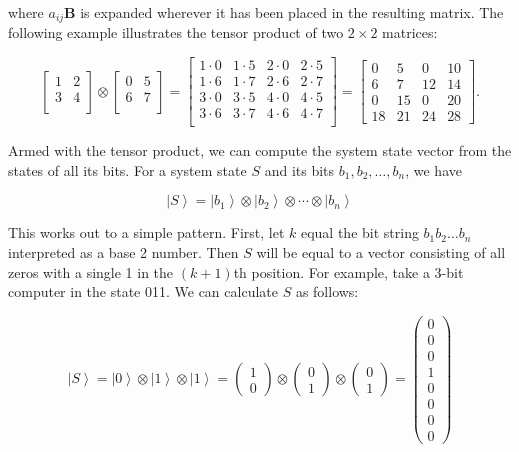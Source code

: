 \documentclass[11pt]{report}
\newcommand{\?}{\stackrel{?}{=}}
\newcommand{\qcol}[2]{\ensuremath{\begin{pmatrix} #1 \\ #2 \end{pmatrix}}}
\begin{document}
where $a_{ij}\mathbf{B}$ is expanded wherever it has been placed in the resulting matrix. The following example illustrates the tensor product of two $2\times2$ matrices:

$$
  \begin{bmatrix}
    1 & 2 \\
    3 & 4 \\
  \end{bmatrix}
\otimes
  \begin{bmatrix}
    0 & 5 \\
    6 & 7 \\
  \end{bmatrix}
=
  \begin{bmatrix}
    1\cdot 0 & 1\cdot 5 & 2\cdot 0 & 2\cdot 5 \\
    1\cdot 6 & 1\cdot 7 & 2\cdot 6 & 2\cdot 7 \\
    3\cdot 0 & 3\cdot 5 & 4\cdot 0 & 4\cdot 5 \\
    3\cdot 6 & 3\cdot 7 & 4\cdot 6 & 4\cdot 7 \\
  \end{bmatrix}
=
  \begin{bmatrix}
    0 & 5 & 0 & 10 \\
    6 & 7 & 12 & 14 \\
    0 & 15 & 0 & 20 \\
    18 & 21 & 24 & 28
  \end{bmatrix}.
$$

Armed with the tensor product, we can compute the system state vector from the states of all its bits. For a system state $S$ and its bits $b_1, b_2, \ldots, b_n$, we have

$$\left | S \right \rangle = \left | b_1 \right \rangle \otimes \left | b_2 \right \rangle \otimes \cdots \otimes \left | b_n \right \rangle$$

This works out to a simple pattern. First, let $k$ equal the bit string $b_1b_2\ldots b_n$ interpreted as a base 2 number. Then $S$ will be equal to a vector consisting of all zeros with a single 1 in the $(k+1)$th position. For example, take a 3-bit computer in the state 011. We can calculate $S$ as follows:

$$\left | S \right \rangle = \left | 0 \right \rangle \otimes \left | 1 \right \rangle \otimes \left | 1 \right \rangle = \qcol{1}{0} \otimes \qcol{0}{1} \otimes \qcol{0}{1} = \begin{pmatrix}0\\0\\0\\1\\0\\0\\0\\0\end{pmatrix}$$
\end{document}
